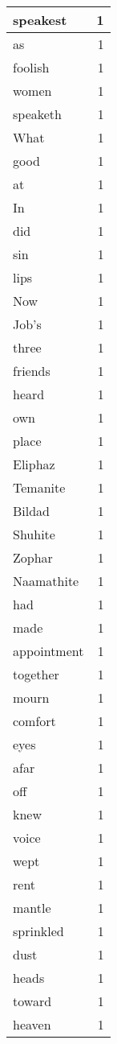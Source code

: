\begin{center}
\begin{longtable}{l|r}
speakest & 1\\ \hline 
as & 1\\ \hline 
foolish & 1\\ \hline 
women & 1\\ \hline 
speaketh & 1\\ \hline 
What & 1\\ \hline 
good & 1\\ \hline 
at & 1\\ \hline 
In & 1\\ \hline 
did & 1\\ \hline 
sin & 1\\ \hline 
lips & 1\\ \hline 
Now & 1\\ \hline 
Job's & 1\\ \hline 
three & 1\\ \hline 
friends & 1\\ \hline 
heard & 1\\ \hline 
own & 1\\ \hline 
place & 1\\ \hline 
Eliphaz & 1\\ \hline 
Temanite & 1\\ \hline 
Bildad & 1\\ \hline 
Shuhite & 1\\ \hline 
Zophar & 1\\ \hline 
Naamathite & 1\\ \hline 
had & 1\\ \hline 
made & 1\\ \hline 
appointment & 1\\ \hline 
together & 1\\ \hline 
mourn & 1\\ \hline 
comfort & 1\\ \hline 
eyes & 1\\ \hline 
afar & 1\\ \hline 
off & 1\\ \hline 
knew & 1\\ \hline 
voice & 1\\ \hline 
wept & 1\\ \hline 
rent & 1\\ \hline 
mantle & 1\\ \hline 
sprinkled & 1\\ \hline 
dust & 1\\ \hline 
heads & 1\\ \hline 
toward & 1\\ \hline 
heaven & 1\\ \hline 

\end{longtable}
\end{center}
